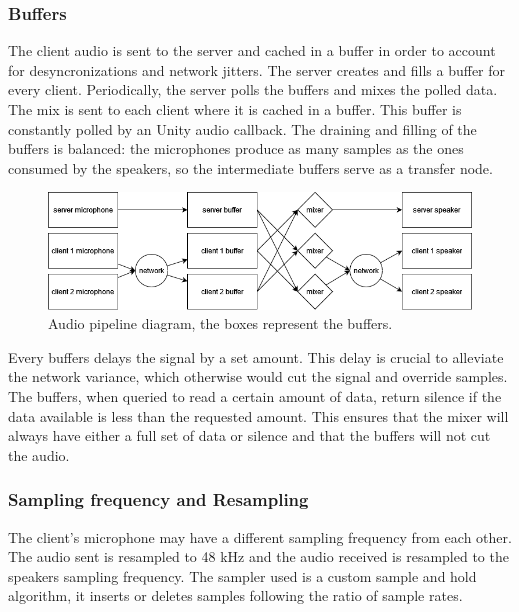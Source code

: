 \documentclass{article}
\begin{document}
\subsubsection{Buffers}
The client audio is sent to the server and cached in a buffer in order to account for desyncronizations and network jitters. The server creates and fills a buffer for every client. Periodically, the server polls the buffers and mixes the polled data. The mix is sent to each client where it is cached in a buffer. This buffer is constantly polled by an Unity audio callback. The draining and filling of the buffers is balanced: the microphones produce as many samples as the ones consumed by the speakers, so the intermediate buffers serve as a transfer node. 
\begin{figure}[H]
\includegraphics[width=\textwidth]{audio mixer}
\caption{Audio pipeline diagram, the boxes represent the buffers.}
\end{figure}
Every buffers delays the signal by a set amount. This delay is crucial to alleviate the network variance, which otherwise would cut the signal and override samples. The buffers, when queried to read a certain amount of data, return silence if the data available is less than the requested amount. This ensures that the mixer will always have either a full set of data or silence and that the buffers will not cut the audio.

\clearpage

\subsubsection{Sampling frequency and Resampling}
The client's microphone may have a different sampling frequency from each other. The audio sent is resampled to 48 kHz and the audio received is resampled to the speakers sampling frequency. The sampler used is a custom sample and hold algorithm, it inserts or deletes samples following the ratio of sample rates.
\end{document}
